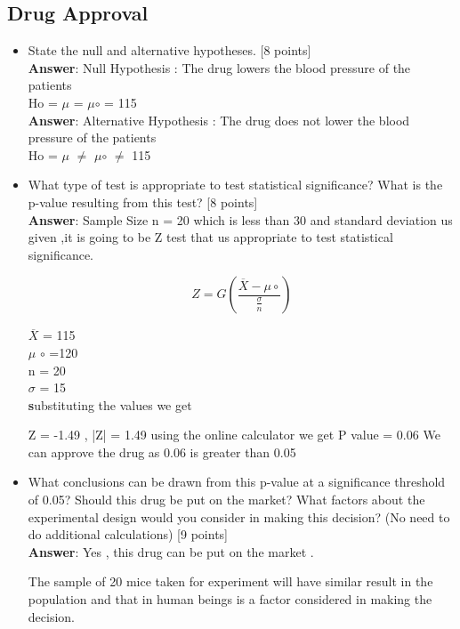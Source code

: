 \documentclass{article}
\begin{document}
\subsection {Drug Approval}
\begin{itemize}
    \item State the null and alternative hypotheses. [8 points]\\
	\textbf{Answer}: {Null Hypothesis} : The drug lowers the blood pressure of the patients \\
	 Ho = $\mu$ = $\mu$$\circ$ = 115\\
	  
\textbf{Answer}: {Alternative Hypothesis} : The drug does not lower the blood pressure of the patients \\	                  Ho = $\mu$ $\neq$ $\mu$$\circ$ $\neq$ 115\\

    \item What type of test is appropriate to test statistical significance? What is the p-value resulting from this test? [8 points] \\
    \textbf{Answer}: Sample Size n = 20 which is less than 30 and standard deviation us given ,it is going to be Z test that us appropriate to test statistical significance.
    
  \[ 
Z = G \left( \frac{\overline{X} - \mu\circ}{\frac{ \sigma} {n}} \right)
\]

    $\overline{X}$ = 115 \\
    $\mu$ $\circ$ =120\\
    n  =  20 \\
    $\sigma$ = 15\\
    \textbf substituting the values we get
    
    Z = -1.49 , |Z| = 1.49
    using the online calculator we get P value = 0.06
    We can approve the drug as 0.06 is greater than 0.05

    
    \item What conclusions can be drawn from this p-value at a significance threshold of 0.05?  Should this drug be put on the market?  What factors about the experimental design would you consider in making this decision?  (No need to do additional calculations) [9 points]\\
    \textbf{Answer}: Yes , this drug can be put on the market .
    
    The sample of 20 mice taken for experiment will have similar result in the population and that in human beings is a factor considered in making the decision.
\end{itemize}
\end{document}
